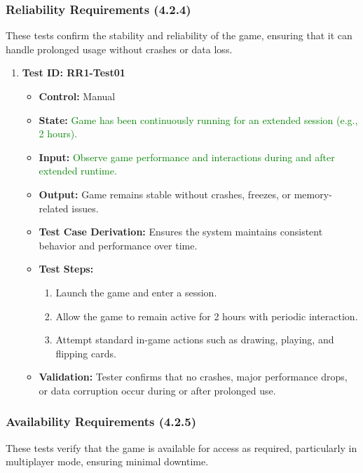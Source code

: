 \documentclass[12pt]{article}
\newcommand{\added}[1]{\textcolor{green}{#1}}
\begin{document}
\subsubsection{Reliability Requirements (4.2.4)}

These tests confirm the stability and reliability of the game, ensuring that it can handle prolonged usage without crashes or data loss.

\begin{enumerate}
    \item \textbf{Test ID: RR1-Test01}
    \begin{itemize}
        \item \textbf{Control:} Manual
        \item \textbf{State:} \added{Game has been continuously running for an extended session (e.g., 2 hours).}
        \item \textbf{Input:} \added{Observe game performance and interactions during and after extended runtime.}
        \item \textbf{Output:} Game remains stable without crashes, freezes, or memory-related issues.
        \item \textbf{Test Case Derivation:} Ensures the system maintains consistent behavior and performance over time.
        \item \textbf{Test Steps:}
        \begin{enumerate}
            \item Launch the game and enter a session.
            \item Allow the game to remain active for 2 hours with periodic interaction.
            \item Attempt standard in-game actions such as drawing, playing, and flipping cards.
        \end{enumerate}
        \item \textbf{Validation:} Tester confirms that no crashes, major performance drops, or data corruption occur during or after prolonged use.
    \end{itemize}
\end{enumerate}

\subsubsection{Availability Requirements (4.2.5)}

These tests verify that the game is available for access as required, particularly in multiplayer mode, ensuring minimal downtime.
\end{document}
